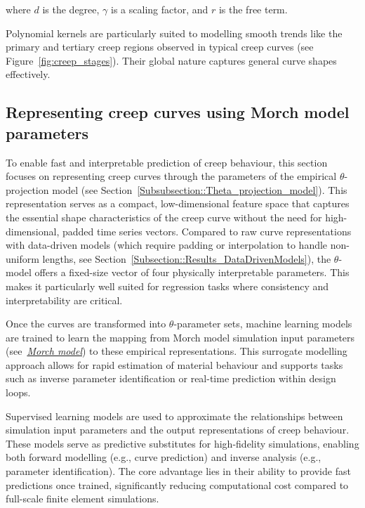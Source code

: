 \documentclass[class=scrbook, crop=false]{standalone}
\begin{document}
	where $d$ is the degree, $\gamma$ is a scaling factor, and $r$ is the free term.
	
	Polynomial kernels are particularly suited to modelling smooth trends like the primary and tertiary creep regions observed in typical creep curves (see Figure~\ref{fig:creep_stages}). Their global nature captures general curve shapes effectively.
	
		
	\subsection{Representing creep curves using Morch model parameters}
	\label{Subsection::Morch_model_represntation}
	
	To enable fast and interpretable prediction of creep behaviour, this section focuses on representing creep curves through the parameters of the empirical $\theta$-projection model (see Section~\ref{Subsubsection::Theta_projection_model}). This representation serves as a compact, low-dimensional feature space that captures the essential shape characteristics of the creep curve without the need for high-dimensional, padded time series vectors. Compared to raw curve representations with data-driven models (which require padding or interpolation to handle non-uniform lengths, see Section~\ref{Subsection::Results_DataDrivenModels}), the $\theta$-model offers a fixed-size vector of four physically interpretable parameters. This makes it particularly well suited for regression tasks where consistency and interpretability are critical.
	
	Once the curves are transformed into $\theta$-parameter sets, machine learning models are trained to learn the mapping from Morch model simulation input parameters (see~\textit{\hyperref[Subsubsection::Morch_Model_Definition]{Morch model}}) to these empirical representations. This surrogate modelling approach allows for rapid estimation of material behaviour and supports tasks such as inverse parameter identification or real-time prediction within design loops.	
	
	Supervised learning models are used to approximate the relationships between simulation input parameters and the output representations of creep behaviour. These models serve as predictive substitutes for high-fidelity simulations, enabling both forward modelling (e.g., curve prediction) and inverse analysis (e.g., parameter identification). The core advantage lies in their ability to provide fast predictions once trained, significantly reducing computational cost compared to full-scale finite element simulations.
	
\end{document}
